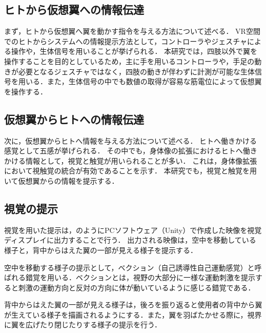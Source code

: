 \begin{small}
  \subsection{ヒトから仮想翼への情報伝達}
    
    まず，ヒトから仮想翼へ翼を動かす指令を与える方法について述べる．
    VR空間でのヒトからシステムへの情報提示方法として，コントローラやジェスチャによる操作や，生体信号を用いることが挙げられる．
    本研究では，四肢以外で翼を操作することを目的としているため，主に手を用いるコントローラや，手足の動きが必要となるジェスチャではなく，四肢の動きが伴わずに計測が可能な生体信号を用いる．また，生体信号の中でも数値の取得が容易な筋電位によって仮想翼を操作する．

  \subsection{仮想翼からヒトへの情報伝達}
    次に，仮想翼からヒトへ情報を与える方法について述べる．
    ヒトへ働きかける感覚として五感が挙げられる．
    その中でも，身体像の拡張におけるヒトへ働きかける情報として，視覚と触覚が用いられることが多い．
    これは，身体像拡張において視触覚の統合が有効であることを示す．
    本研究でも，視覚と触覚を用いて仮想翼からの情報を提示する．
   

    \subsection{視覚の提示} %
      
      視覚を用いた提示は，のようにPCソフトウェア（Unity）で作成した映像を視覚ディスプレイに出力することで行う．
      出力される映像は，空中を移動している様子と，背中からはえた翼の一部が見える様子を提示する．

      空中を移動する様子の提示として，ベクション（自己誘導性自己運動感覚）と呼ばれる錯覚を用いる．ベクションとは，視野の大部分に一様な運動刺激を提示すると刺激の運動方向と反対の方向に体が動いているように感じる錯覚である\cite{妹尾武治2014ベクションとその周辺の近年の動向}．

      背中からはえた翼の一部が見える様子は，後ろを振り返ると使用者の背中から翼が生えている様子を描画されるようにする．また，翼を羽ばたかせる際に，視界に翼を広げたり閉じたりする様子の提示を行う．


\end{small}
